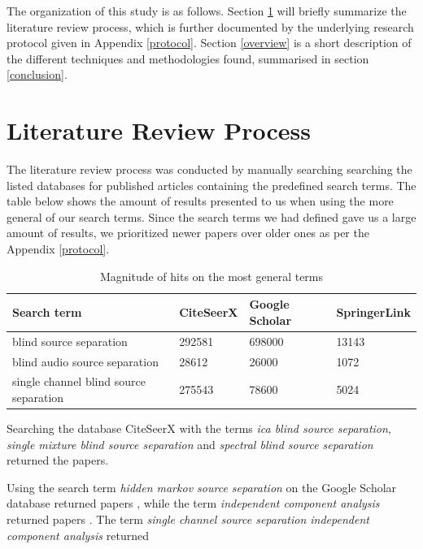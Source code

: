 \documentclass[11pt, oneside, a4paper]{report}
\begin{document}
The organization of this study is as follows. Section
\ref{reviewProcess} will briefly summarize the literature review
process, which is further documented by the underlying research
protocol given in Appendix \ref{protocol}. Section \ref{overview} is
a short description of the different techniques and methodologies found, summarised in section \ref{conclusion}.


\section{Literature Review Process}\label{reviewProcess} %
The literature review process was conducted by manually searching searching the listed databases for published articles containing the predefined search terms.
The table below shows the amount of results presented to us when  using the more general of our search terms. Since the search terms we had defined gave us a large amount of results, we prioritized newer papers over older ones as per the Appendix \ref{protocol}.

\begin{table}[h]
\centering
	\begin{tabular}{|l|l|l|l|}
	\hline
	\textbf{Search term} & \textbf{CiteSeerX} & \textbf{Google Scholar} & \textbf{SpringerLink} \\
	\hline
	blind source separation & 292581 & 698000 & 13143\\
	blind audio source separation & 28612 & 26000 & 1072\\
	single channel blind source separation & 275543 & 78600 & 5024\\
	\hline
	\end{tabular}
\caption{Magnitude of hits on the most general terms}
\label{tab:myfirsttable}
\end{table}

Searching the database CiteSeerX with the terms \emph{ica blind source separation}, \emph{single mixture blind source separation} and \emph{spectral blind source separation} returned the papers\cite{bellSejnowski95}\cite{hyvarinen2001}. 

Using the search term \emph{hidden markov source separation} on the Google Scholar database returned papers \cite{roweisOneMic} \cite{VargaHMMDecomp}, while the term \emph{independent component analysis} returned papers\cite{comon94} \cite{fastICA}. The term \emph{single channel source separation independent component analysis} returned \cite{davies2007}
\end{document}
